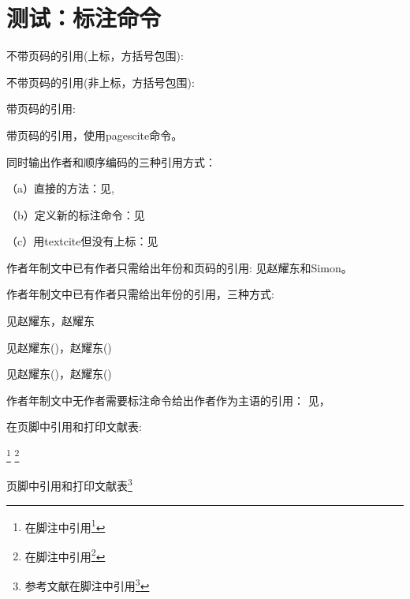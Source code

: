 \documentclass[twoside]{article}
\begin{document}
    \section{测试：标注命令}
    \begin{refsection}
     不带页码的引用(上标，方括号包围):
     \cite{FOURNEY1971-17-38}\cite{wang2006another}

     不带页码的引用(非上标，方括号包围):
     \parencite{FOURNEY1971-17-38}\parencite{wang2006another}

     带页码的引用:
     \cite[见][49页]{FOURNEY1971-17-38} \parencite[见][49页]{wang2006another}

     带页码的引用，使用pagescite命令。
\parencite[见][49页]{Miroslav2004--}\cite[见][49页]{蔡敏2006--}

     同时输出作者和顺序编码的三种引用方式：

    （a）直接的方法：见\citeauthor{FOURNEY1971-17-38}\cite{FOURNEY1971-17-38}, \citeauthor{wang2006another}\cite{wang2006another}

    （b）定义新的标注命令：见

    （c）用textcite但没有上标：见\textcite{FOURNEY1971-17-38,wang2006another}


作者年制文中已有作者只需给出年份和页码的引用:
见赵耀东和Simon。

作者年制文中已有作者只需给出年份的引用，三种方式:

见赵耀东，赵耀东

见赵耀东(\cite*{FOURNEY1971-17-38})，赵耀东(\cite*{wang2006another})

见赵耀东(\citeyear{FOURNEY1971-17-38})，赵耀东(\citeyear{wang2006another})

作者年制文中无作者需要标注命令给出作者作为主语的引用：
见\textcite{FOURNEY1971-17-38}，\textcite{wang2006another}

     在页脚中引用和打印文献表:

     \footnote{在脚注中引用\footcite{FOURNEY1971-17-38}} 
     \footnote{在脚注中引用\footcite{wang2006another}} 

     页脚中引用和打印文献表\footnote{参考文献在脚注中引用\footcite{赵学功2001--}}  

    \printbibliography
    \end{refsection}
\end{document}
